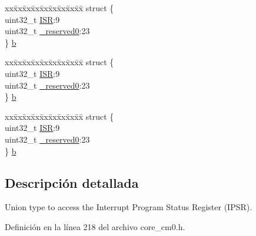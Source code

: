 \begin{DoxyCompactItemize}
\begin{tabbing}
\end{tabbing}\item 
\begin{tabbing}
xx\=xx\=xx\=xx\=xx\=xx\=xx\=xx\=xx\=\kill
struct \{\\
\>uint32\_t \hyperlink{union_i_p_s_r___type_ad502ba7dbb2aab5f87c782b28f02622d}{ISR}:9\\
\>uint32\_t \hyperlink{union_i_p_s_r___type_ac8a6a13838a897c8d0b8bc991bbaf7c1}{\_reserved0}:23\\
\} \hyperlink{union_i_p_s_r___type_a9da38bc566a366ab30cb221935ab2c46}{b}\\

\end{tabbing}\item 
\begin{tabbing}
xx\=xx\=xx\=xx\=xx\=xx\=xx\=xx\=xx\=\kill
struct \{\\
\>uint32\_t \hyperlink{union_i_p_s_r___type_ad502ba7dbb2aab5f87c782b28f02622d}{ISR}:9\\
\>uint32\_t \hyperlink{union_i_p_s_r___type_ac8a6a13838a897c8d0b8bc991bbaf7c1}{\_reserved0}:23\\
\} \hyperlink{union_i_p_s_r___type_a77bc2e3569776643bbcd77a7b2bc69c3}{b}\\

\end{tabbing}\item 
\begin{tabbing}
xx\=xx\=xx\=xx\=xx\=xx\=xx\=xx\=xx\=\kill
struct \{\\
\>uint32\_t \hyperlink{union_i_p_s_r___type_ad502ba7dbb2aab5f87c782b28f02622d}{ISR}:9\\
\>uint32\_t \hyperlink{union_i_p_s_r___type_ac8a6a13838a897c8d0b8bc991bbaf7c1}{\_reserved0}:23\\
\} \hyperlink{union_i_p_s_r___type_ac084c51939b6ba8158a34b784e88a14b}{b}\\

\end{tabbing}\end{DoxyCompactItemize}


\subsection{Descripción detallada}
Union type to access the Interrupt Program Status Register (I\+P\+SR). 

Definición en la línea 218 del archivo core\+\_\+cm0.\+h.



